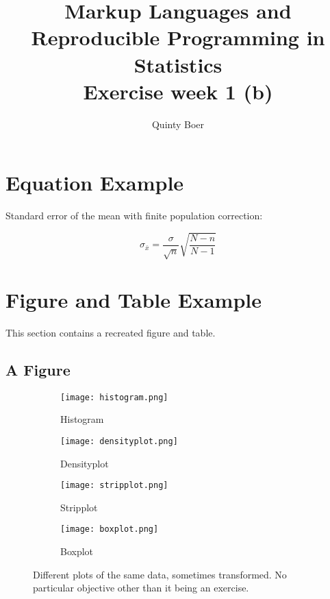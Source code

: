 \documentclass[10pt, a4paper, titlepage]{article}
\title{Markup Languages and Reproducible Programming in Statistics \\ \small Exercise week 1 (b)}
\author{Quinty Boer}
\date{}
\begin{document}
\maketitle
\newpage

\section{Equation Example}

Standard error of the mean with finite population correction:

\begin{equation}
    \sigma_{\bar{x}} = \frac{\sigma}{\sqrt{n}} \sqrt{\frac{N-n}{N-1}}
\end{equation}

\section{Figure and Table Example}

This section contains a recreated figure and table.

\subsection{A Figure}

\begin{figure}[H]
\centering
\begin{subfigure}[b]{0.45\textwidth}
    \centering
    \texttt{[image: histogram.png]}
    \caption{Histogram}
    \label{fig:histogram}
\end{subfigure}
\hfill
\begin{subfigure}[b]{0.45\textwidth}
    \centering
    \texttt{[image: densityplot.png]}
    \caption{Densityplot}
    \label{fig:densityplot}
\end{subfigure}
\vspace{0.5cm}
\begin{subfigure}[b]{0.45\textwidth}
    \centering
    \texttt{[image: stripplot.png]}
    \caption{Stripplot}
    \label{fig:stripplot}
\end{subfigure}
\hfill
\begin{subfigure}[b]{0.45\textwidth}
    \centering
    \texttt{[image: boxplot.png]}
    \caption{Boxplot}
    \label{fig:boxplot}
\end{subfigure}
\caption{Different plots of the same data, sometimes transformed. No particular objective other than it being an exercise.}
\label{fig:plots}
\end{figure}
\end{document}
